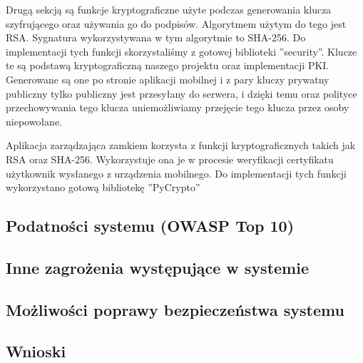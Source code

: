 Drugą sekcją są funkcje kryptograficzne użyte podczas generowania klucza szyfrującego oraz używania go do podpisów. Algorytmem użytym do tego jest RSA. Sygnatura wykorzystywana w tym algorytmie to SHA-256. Do implementacji tych funkcji skorzystaliśmy z gotowej biblioteki ''security''. Klucze te są podstawą kryptograficzną naszego projektu oraz implementacji PKI. Generowane są one po stronie aplikacji mobilnej i z pary kluczy prywatny publiczny tylko publiczny jest przesyłany do serwera, i dzięki temu oraz polityce przechowywania tego klucza uniemożliwiamy przejęcie tego klucza przez osoby niepowołane.

Aplikacja zarządzająca zamkiem korzysta z funkcji kryptograficznych takich jak RSA oraz SHA-256. Wykorzystuje ona je w procesie weryfikacji certyfikatu użytkownik wysłanego z urządzenia mobilnego. Do implementacji tych funkcji wykorzystano gotową bibliotekę ''PyCrypto''
\newpage
\subsection[Podatności systemu (OWASP Top 10)]{Podatności systemu (OWASP Top 10) \newline [\StudentA]}
	

\newpage
\subsection[Inne zagrożenia występujące w systemie]{Inne zagrożenia występujące w systemie \newline [\StudentB]}

\newpage
\subsection[Możliwości poprawy bezpieczeństwa systemu]{Możliwości poprawy bezpieczeństwa systemu \newline [\StudentA]}

\newpage
\subsection{Wnioski}
 
